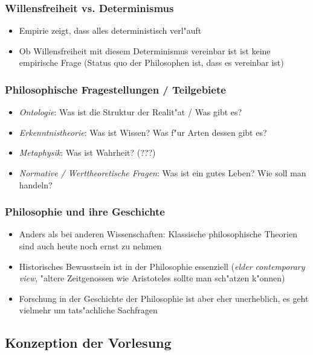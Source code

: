 \documentclass[]{scrartcl}
\begin{document}
\subsubsection{Willensfreiheit vs. Determinismus}

\begin{itemize}
  \item Empirie zeigt, dass alles deterministisch verl"auft
  \item Ob Willensfreiheit mit diesem Determinismus vereinbar ist ist keine empirische Frage (Status quo der Philosophen ist, dass es vereinbar ist)
\end{itemize}

\subsubsection{Philosophische Fragestellungen / Teilgebiete}

\begin{itemize}
  \item \emph{Ontologie}: Was ist die Struktur der Realit"at / Was gibt es?
  \item \emph{Erkenntnistheorie}: Was ist Wissen? Was f"ur Arten dessen gibt es?
  \item \emph{Metaphysik}: Was ist Wahrheit? (???)
  \item \emph{Normative / Werttheoretische Fragen}: Was ist ein gutes Leben? Wie soll man handeln?
\end{itemize}

\subsubsection{Philosophie und ihre Geschichte}

\begin{itemize}
  \item Anders als bei anderen Wissenschaften: Klassische philosophische Theorien sind auch heute noch ernst zu nehmen
  \item Historisches Bewusstsein ist in der Philosophie essenziell (\emph{elder contemporary view}, "altere Zeitgenossen wie Aristoteles sollte man sch"atzen k"onnen)
  \item Forschung in der Geschichte der Philosophie ist aber eher unerheblich, es geht vielmehr um tats"achliche Sachfragen
\end{itemize}

\subsection{Konzeption der Vorlesung}
\end{document}

